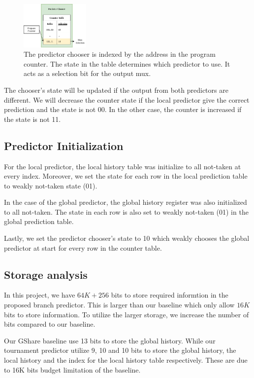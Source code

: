\documentclass[conference]{IEEEtran}
\begin{document}
\begin{figure}[h]
    \centering
    \includegraphics[width=0.3\textwidth]{imgs/predictor_chooser}
    \caption{The predictor chooser is indexed by the address in the program counter. The state in the table
    determines which predictor to use. It acts as a selection bit for the output mux.}
    \label{fig:predictor_chooser}
\end{figure}

The chooser's state will be updated if the output from both predictors are different. We will decrease the
counter state if the local predictor give the correct prediction and the state is not 00. In the other case,
the counter is increased if the state is not 11.

\subsection{Predictor Initialization}

For the local predictor, the local history table was initialize to all not-taken at every
index. Moreover, we set the state for each row in the local prediction table to weakly not-taken
state (01).

In the case of the global predictor, the global history register was also initialized to all not-taken.
The state in each row is also set to weakly not-taken (01) in the global prediction table.

Lastly, we set the predictor chooser's state to 10 which weakly chooses the global predictor
at start for every row in the counter table.

\subsection{Storage analysis}

In this project, we have $64K + 256$ bits to store required informtion in the proposed branch
predictor. This is larger than our baseline which only allow $16K$ bits to store information.
To utilize the larger storage, we increase the number of bits compared to our baseline.

Our GShare baseline use 13 bits to store the global history. While our tournament predictor
utilize 9, 10 and 10 bits to store the global history, the local history and the index for the
local history table respectively. These are due to 16K bits budget limitation of the baseline.
\end{document}

